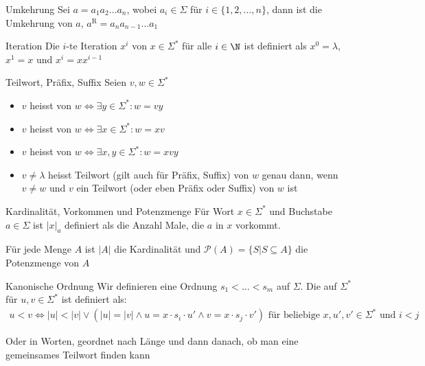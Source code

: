\begin{definition}[]{Umkehrung}
    Sei $a = a_1 a_2 \ldots a_n$, wobei $a_i \in \Sigma$ für $i \in \{1, 2, \ldots, n\}$, dann ist die Umkehrung von $a$, $a^{\text{R}} = a_n a_{n - 1} \ldots a_1$
\end{definition}


\begin{definition}[]{Iteration}
    Die $i$-te Iteration $x^i$ von $x \in \Sigma^*$ für alle $i \in \N$ ist definiert als $x^0 = \lambda$, $x^1 = x$ und $x^i = xx^{i - 1}$
\end{definition}


\begin{definition}[]{Teilwort, Präfix, Suffix}
    Seien $v, w \in \Sigma^*$
    \begin{itemize}
        \item $v$ heisst  von $w \Longleftrightarrow \exists y \in \Sigma^* : w = vy$
        \item $v$ heisst  von $w \Longleftrightarrow \exists x \in \Sigma^* : w = xv$
        \item $v$ heisst  von $w \Longleftrightarrow \exists x, y \in \Sigma^* : w = xvy$
        \item $v \neq \lambda$ heisst  Teilwort (gilt auch für Präfix, Suffix) von $w$ genau dann, wenn $v \neq w$ und $v$ ein Teilwort (oder eben Präfix oder Suffix) von $w$ ist
    \end{itemize}
\end{definition}

\begin{definition}[]{Kardinalität, Vorkommen und Potenzmenge}
    Für Wort $x \in \Sigma^*$ und Buchstabe $a \in \Sigma$ ist $|x|_a$ definiert als die Anzahl Male, die $a$ in $x$ vorkommt.

    Für jede Menge $A$ ist $|A|$ die Kardinalität und $\mathcal{P}(A) = \{S | S \subseteq A\}$ die Potenzmenge von $A$
\end{definition}


\begin{definition}[]{Kanonische Ordnung}
    Wir definieren eine Ordnung $s_1 < \ldots < s_m$ auf $\Sigma$. Die  auf $\Sigma^*$ für $u, v \in \Sigma^*$ ist definiert als:
    \begin{align*}
        u < v \Longleftrightarrow |u| < |v| \lor (|u| = |v| \land u = x \cdot s_i \cdot u' \land v = x \cdot s_j \cdot v') \text{ für beliebige $x, u', v' \in \Sigma^*$ und $i < j$}
    \end{align*}

    Oder in Worten, geordnet nach Länge und dann danach, ob man eine gemeinsames Teilwort finden kann
\end{definition}


